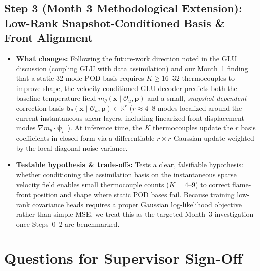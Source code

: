 \documentclass[11pt,letterpaper]{article}
\begin{document}
\subsection*{Step 3 (Month 3 Methodological Extension): Low-Rank Snapshot-Conditioned Basis \& Front Alignment}
\begin{itemize}
    \item \textbf{What changes:} Following the future-work direction noted in the GLU discussion (coupling GLU with data assimilation) and our Month~1 finding that a static 32-mode POD basis requires $K \ge 16\text{--}32$ thermocouples to improve shape, the velocity-conditioned GLU decoder predicts both the baseline temperature field $m_\theta(\mathbf{x} \mid \mathcal{O}_u, \mathbf{p})$ and a small, \emph{snapshot-dependent} correction basis $\mathbf{b}_\theta(\mathbf{x} \mid \mathcal{O}_u, \mathbf{p}) \in \mathbb{R}^r$ ($r \approx 4\text{--}8$ modes localized around the current instantaneous shear layers, including linearized front-displacement modes $\nabla m_\theta \cdot \boldsymbol{\psi}_i$~\cite{ravela2007field}). At inference time, the $K$ thermocouples update the $r$ basis coefficients in closed form via a differentiable $r \times r$ Gaussian update weighted by the local diagonal noise variance.
    \item \textbf{Testable hypothesis \& trade-offs:} Tests a clear, falsifiable hypothesis: whether conditioning the assimilation basis on the instantaneous sparse velocity field enables small thermocouple counts ($K = 4\text{--}9$) to correct flame-front position and shape where static POD bases fail. Because training low-rank covariance heads requires a proper Gaussian log-likelihood objective rather than simple MSE, we treat this as the targeted Month~3 investigation once Steps~0--2 are benchmarked.
\end{itemize}

\section{Questions for Supervisor Sign-Off}
\end{document}
